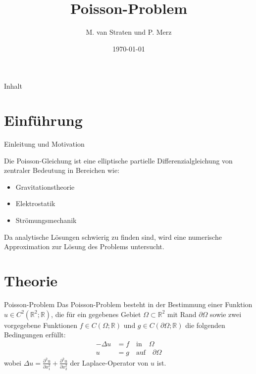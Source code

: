 \documentclass[9pt, t]{beamer}
\title{Poisson-Problem}
\author{M. van Straten und P. Merz}
\institute{Humboldt-Universität zu Berlin \\
           Wintersemester 2024}
\date{\today}
\begin{document}
\maketitle

\begin{frame}{Inhalt}
    \tableofcontents[pausesections]
\end{frame}










\section{Einführung}


\begin{frame}{Einleitung und Motivation}

Die Poisson-Gleichung ist eine elliptische partielle Differenzialgleichung von zentraler Bedeutung in Bereichen wie:

\begin{itemize}
    \item Gravitationstheorie
    \item Elektrostatik
    \item Strömungsmechanik
\end{itemize}

Da analytische Lösungen schwierig zu finden sind, wird eine numerische Approximation zur Lösung des Problems untersucht.
\end{frame}












\section{Theorie}

\begin{frame}{Poisson-Problem}
  Das Poisson-Problem besteht in der Bestimmung einer Funktion \(u \in C^2(\mathbb{R}^2; \mathbb{R})\), die für ein gegebenes Gebiet \(\Omega \subset \mathbb{R}^2\) mit Rand \(\partial \Omega\) sowie zwei vorgegebene Funktionen \(f \in C(\Omega; \mathbb{R})\) und \(g \in C(\partial \Omega; \mathbb{R})\) die folgenden Bedingungen erfüllt:
  \begin{align*} 
    -\Delta u &= f \quad \text{in} \quad \Omega 
    \\ 
            u &= g \quad \text{auf} \quad \partial \Omega
    
  
  \end{align*}
  wobei \(\Delta u = \frac{\partial^2 u}{\partial x_1^2} + \frac{\partial^2 u}{\partial x_2^2}\) der Laplace-Operator von \(u\) ist.
\end{frame}  
\end{document}
